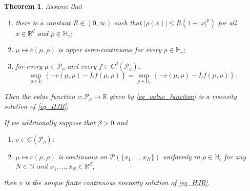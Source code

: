 \documentclass{article}
\newtheorem{theorem}{Theorem}[section]
\theoremstyle{definition}
\numberwithin{equation}{section}
\numberwithin{theorem}{section}
\newcommand{\R}{\mathbb{R}}
\newcommand{\Hb}{\mathbb{H}}
\renewcommand{\r}{R}
\newcommand{\Nb}{\mathbb{N}}
\newcommand{\Pc}{\mathcal{P}}
\newcommand{\Pcal}{{\mathcal P}}
\begin{document}
\begin{theorem}\label{thetheorem}
Assume that 
\begin{enumerate}
\item\label{itii0}  there is a constant $\r \in (0,\infty)$ such that $|\rho(x)| \le R( 1 + |x|^p )$ for all $x \in {\R^d}$ and $\rho \in \Hb_c$;
\item\label{itii} $\mu\mapsto c(\mu,\rho)$ is upper semi-continuous for every $\rho\in \mathbb H_c$;
\item\label{itiii} for every $\mu \in \Pcal_p$ and every $f \in C^2(\Pcal_q)$,
$$\sup_{\rho\in\Hb}\left\{ - c(\mu,\rho) - Lf(\mu,\rho) \right\}
=\sup_{\rho\in\Hb_c}\left\{ - c(\mu,\rho) - Lf(\mu,\rho) \right\}.$$
\end{enumerate}
Then the value function $v\colon\Pcal_p\to\overline{\R}$ given by \eqref{eq_value_function} is a viscosity solution of \eqref{eq_HJB}.

If we additionally suppose that $\beta > 0$ and %
\begin{enumerate}[resume]
\item\label{itv} $v\in C(\Pcal_p)$;
\item \label{itvi} $\mu\mapsto c(\mu,\rho)$ is continuous on $\Pc(\{x_1,...,x_N\})$ uniformly in $\rho\in\Hb_c$ for any $N\in\Nb$ and $x_1,...,x_N\in  {\R^d}$, %
\end{enumerate}
then $v$ is the unique finite continuous viscosity solution of \eqref{eq_HJB}.
\end{theorem}
\end{document}
